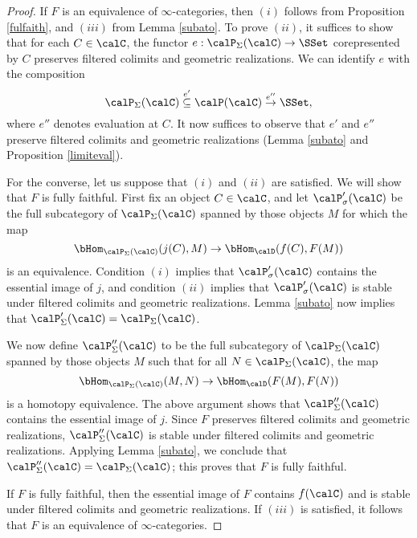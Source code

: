 \begin{proof}
If $F$ is an equivalence of $\infty$-categories, then $(i)$ follows from Proposition \ref{fulfaith}, and $(iii)$ from Lemma \ref{subato}. To prove $(ii)$, it suffices to show that for
each $C \in \calC$, the functor $e: \calP_{\Sigma}(\calC) \rightarrow \SSet$ corepresented by $C$ preserves filtered colimits and geometric realizations. We can identify $e$ with the composition
$$ \calP_{\Sigma}(\calC) \stackrel{e'}{\subseteq} \calP(\calC) \stackrel{e''}{\rightarrow} \SSet,$$
where $e''$ denotes evaluation at $C$. It now suffices to observe that $e'$ and $e''$
preserve filtered colimits and geometric realizations (Lemma \ref{subato} and Proposition \ref{limiteval}).

For the converse, let us suppose that $(i)$ and $(ii)$ are satisfied. We will show that $F$ is fully faithful. First fix an object $C \in \calC$, and let $\calP'_{\sigma}(\calC)$ be the full subcategory
of $\calP_{\Sigma}(\calC)$ spanned by those objects $M$ for which the map
$$ \bHom_{ \calP_{\Sigma}(\calC)}( j(C), M) \rightarrow \bHom_{\calD}(f(C), F(M) )$$
is an equivalence. Condition $(i)$ implies that $\calP'_{\sigma}(\calC)$ contains the essential image of $j$, and condition $(ii)$ implies that $\calP'_{\sigma}(\calC)$ is stable under filtered colimits and geometric realizations. Lemma \ref{subato} now implies that $\calP'_{\Sigma}(\calC) = \calP_{\Sigma}(\calC)$.

We now define $\calP''_{\Sigma}(\calC)$ to be the full subcategory of $\calP_{\Sigma}(\calC)$ spanned by those objects $M$ such that for all $N \in \calP_{\Sigma}(\calC)$, the map
$$ \bHom_{ \calP_{\Sigma}(\calC)}(M,N) \rightarrow \bHom_{\calD}( F(M), F(N) )$$
is a homotopy equivalence. The above argument shows that $\calP''_{\Sigma}(\calC)$ contains
the essential image of $j$. Since $F$ preserves filtered colimits and geometric realizations,
$\calP''_{\Sigma}(\calC)$ is stable under filtered colimits and geometric realizations. Applying Lemma \ref{subato}, we conclude that $\calP''_{\Sigma}(\calC) = \calP_{\Sigma}(\calC)$; this proves that $F$ is fully faithful.

If $F$ is fully faithful, then the essential image of $F$ contains $f(\calC)$ and is stable under filtered colimits and geometric realizations. If $(iii)$ is satisfied, it follows that $F$ is an equivalence of $\infty$-categories.
\end{proof}

